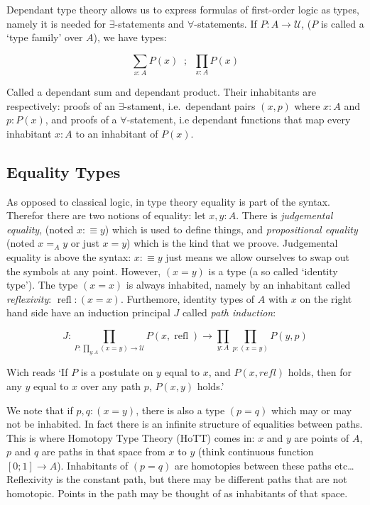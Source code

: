 \documentclass{article}
\DeclareMathOperator{\refl}{refl}
\begin{document}
Dependant type theory allows us to express formulas of first-order logic as types, namely it is needed for $\exists$-statements and $\forall$-statements. If $P : A \to \mathcal{U}$, ($P$ is called a `type family' over $A$), we have types:

\[\sum_{x : A}P(x) \; \; ; \; \; \prod_{x : A}P(x) \]

Called a dependant sum and dependant product. Their inhabitants are respectively: proofs of an $\exists$-stament, i.e.\ dependant pairs $(x , p)$ where $x : A$ and $p : P(x)$, and proofs of a $\forall$-statement, i.e dependant functions that map every inhabitant $x : A$ to an inhabitant of $P(x)$.

\subsection{Equality Types}

As opposed to classical logic, in type theory equality is part of the syntax. Therefor there are two notions of equality: let $x,y : A$. There is \emph{judgemental equality}, (noted $x :\equiv y$) which is used to define things, and \emph{propositional equality} (noted $x =_{A} y$ or just $x = y$) which is the kind that we proove. Judgemental equality is above the syntax: $x :\equiv y$ just means we allow ourselves to swap out the symbols at any point. However, $(x = y)$ is a type (a so called `identity type'). The type $(x = x)$ is always inhabited, namely by an inhabitant called \emph{reflexivity}: $\refl : (x = x)$. Furthemore, identity types of $A$ with $x$ on the right hand side have an induction principal $J$ called \emph{path induction}:

\[J : \prod_{P : \prod_{y : A} (x = y) \to \mathcal{U}} P(x, \refl) \to \prod_{y: A} \prod_{p : (x = y)} P(y,p)\]

Wich reads `If $P$ is a postulate on $y$ equal to $x$, and $P(x,refl)$ holds, then for any $y$ equal to $x$ over any path $p$, $P(x,y)$ holds.'

We note that if $p,q : (x = y)$, there is also a type $(p = q)$ which may or may not be inhabited. In fact there is an infinite structure of equalities between paths. This is where Homotopy Type Theory (HoTT) comes in: $x$ and $y$ are points of $A$, $p$ and $q$ are paths in that space from $x$ to $y$ (think continuous function $\left[ 0;1\right] \to A$). Inhabitants of $(p = q)$ are homotopies between these paths etc\ldots Reflexivity is the constant path, but there may be different paths that are not homotopic. Points in the path may be thought of as inhabitants of that space.
\end{document}
